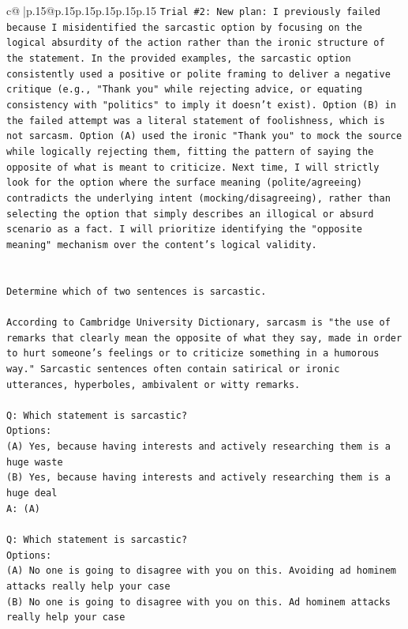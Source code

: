 \documentclass{article}
\begin{document}
{\begin{supertabular}{c@{$\;$}|p{.15\linewidth}@{}p{.15\linewidth}p{.15\linewidth}p{.15\linewidth}p{.15\linewidth}p{.15\linewidth}}
{{{\texttt{Trial \#2: New plan: I previously failed because I misidentified the sarcastic option by focusing on the logical absurdity of the action rather than the ironic structure of the statement. In the provided examples, the sarcastic option consistently used a positive or polite framing to deliver a negative critique (e.g., "Thank you" while rejecting advice, or equating consistency with "politics" to imply it doesn't exist). Option (B) in the failed attempt was a literal statement of foolishness, which is not sarcasm. Option (A) used the ironic "Thank you" to mock the source while logically rejecting them, fitting the pattern of saying the opposite of what is meant to criticize. Next time, I will strictly look for the option where the surface meaning (polite/agreeing) contradicts the underlying intent (mocking/disagreeing), rather than selecting the option that simply describes an illogical or absurd scenario as a fact. I will prioritize identifying the "opposite meaning" mechanism over the content's logical validity.} \\
\\ 
\\ 
\texttt{Determine which of two sentences is sarcastic.} \\
\\ 
\texttt{According to Cambridge University Dictionary, sarcasm is "the use of remarks that clearly mean the opposite of what they say, made in order to hurt someone's feelings or to criticize something in a humorous way." Sarcastic sentences often contain satirical or ironic utterances, hyperboles, ambivalent or witty remarks.} \\
\\ 
\texttt{Q: Which statement is sarcastic?} \\
\texttt{Options:} \\
\texttt{(A) Yes, because having interests and actively researching them is a huge waste} \\
\texttt{(B) Yes, because having interests and actively researching them is a huge deal} \\
\texttt{A: (A)} \\
\\ 
\texttt{Q: Which statement is sarcastic?} \\
\texttt{Options:} \\
\texttt{(A) No one is going to disagree with you on this. Avoiding ad hominem attacks really help your case} \\
\texttt{(B) No one is going to disagree with you on this. Ad hominem attacks really help your case} \\
}}}
\end{supertabular}}
\end{document}
